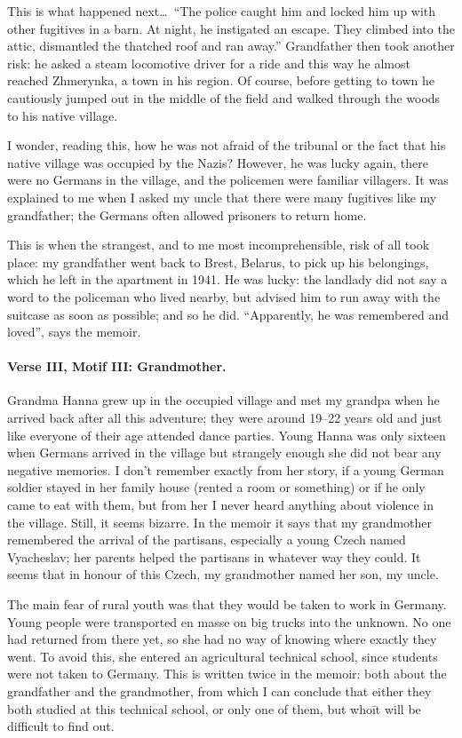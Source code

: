 This is what happened next\ldots\ ``The police caught him and locked
him up with other fugitives in a barn. At night, he instigated an
escape. They climbed into the attic, dismantled the thatched roof and
ran away.'' Grandfather then took another risk: he asked a steam
locomotive driver for a ride and this way he almost reached Zhmerynka,
a town in his region. Of course, before getting to town he cautiously
jumped out in the middle of the field and walked through the woods to
his native village.

I wonder, reading this, how he was not afraid of the tribunal or the
fact that his native village was occupied by the Nazis? However, he
was lucky again, there were no Germans in the village, and the
policemen were familiar villagers. It was explained to me when I asked
my uncle that there were many fugitives like my grandfather; the
Germans often allowed prisoners to return home.

This is when the strangest, and to me most incomprehensible, risk of all
took place: my grandfather went back to Brest, Belarus, to pick up his
belongings, which he left in the apartment in 1941. He was lucky: the
landlady did not say a word to the policeman who lived nearby, but
advised him to run away with the suitcase as soon as possible; and so
he did. ``Apparently, he was remembered and loved'', says the memoir.

\paragraph{Verse III, Motif III: Grandmother.}

Grandma Hanna grew up in the occupied village and met my grandpa when
he arrived back after all this adventure; they were around 19--22 years
old and just like everyone of their age attended dance parties. Young
Hanna was only sixteen when Germans arrived in the village but
strangely enough she did not bear any negative memories. I don't
remember exactly from her story, if a young German soldier stayed in
her family house (rented a room or something) or if he only came to
eat with them, but from her I never heard anything about violence in
the village. Still, it seems bizarre. In the memoir it says that my
grandmother remembered the arrival of the partisans, especially a
young Czech named Vyacheslav; her parents helped the partisans in
whatever way they could. It seems that in honour of this Czech, my
grandmother named her son, my uncle.

The main fear of rural youth was that they would be taken to work in
Germany. Young people were transported en masse on big trucks into the
unknown. No one had returned from there yet, so she had no way of
knowing where exactly they went. To avoid this, she entered an
agricultural technical school, since students were not taken to
Germany. This is written twice in the memoir: both about the
grandfather and the grandmother, from which I can conclude that either
they both studied at this technical school, or only one of them, but
who\=it will be difficult to find out.

